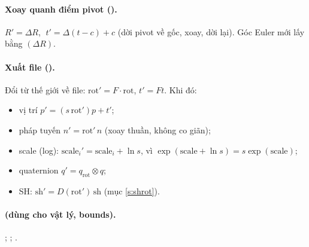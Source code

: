\paragraph{Xoay quanh điểm pivot ().}
$R'=\Delta R$, $\;t'=\Delta(t-c)+c$ (dời pivot về gốc, xoay, dời lại). Góc Euler mới lấy bằng $(\Delta R)$.

\paragraph{Xuất file ().}
Đổi từ thế giới về file: $\mathrm{rot}'=F\cdot\mathrm{rot}$, $t'=F t$. Khi đó:
\begin{itemize}
\item vị trí $p'=(s\,\mathrm{rot}')p+t'$;
\item pháp tuyến $n'=\mathrm{rot}'\,n$ (xoay thuần, không co giãn);
\item scale (log): $\mathrm{scale}_i'=\mathrm{scale}_i+\ln s$, vì $\exp(\mathrm{scale}+\ln s)=s\exp(\mathrm{scale})$;
\item quaternion $q'=q_{\mathrm{rot}}\otimes q$;
\item SH: $\mathrm{sh}'=D(\mathrm{rot}')\,\mathrm{sh}$ (mục \ref{s:shrot}).
\end{itemize}

\paragraph{ (dùng cho vật lý, bounds).}
; ; .
